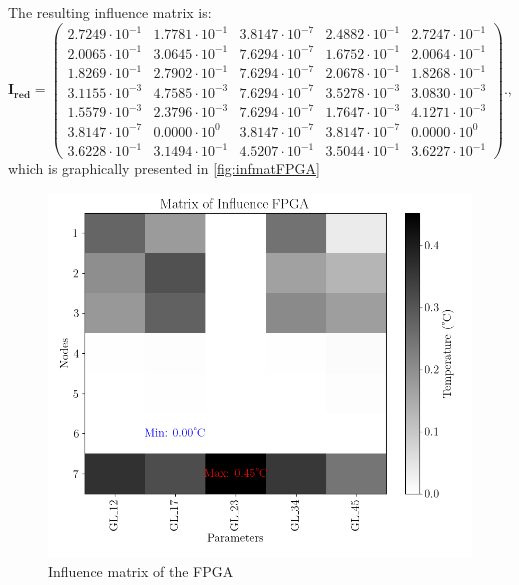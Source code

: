 The resulting influence matrix is:
\begin{equation}
    \boldsymbol{I_{red}} = \begin{pmatrix}
        2.7249 \cdot 10^{-1} & 1.7781 \cdot 10^{-1} & 3.8147 \cdot 10^{-7} & 2.4882 \cdot 10^{-1} & 2.7247 \cdot 10^{-1} \\
        2.0065 \cdot 10^{-1} & 3.0645 \cdot 10^{-1} & 7.6294 \cdot 10^{-7} & 1.6752 \cdot 10^{-1} & 2.0064 \cdot 10^{-1} \\
        1.8269 \cdot 10^{-1} & 2.7902 \cdot 10^{-1} & 7.6294 \cdot 10^{-7} & 2.0678 \cdot 10^{-1} & 1.8268 \cdot 10^{-1} \\
        3.1155 \cdot 10^{-3} & 4.7585 \cdot 10^{-3} & 7.6294 \cdot 10^{-7} & 3.5278 \cdot 10^{-3} & 3.0830 \cdot 10^{-3} \\
        1.5579 \cdot 10^{-3} & 2.3796 \cdot 10^{-3} & 7.6294 \cdot 10^{-7} & 1.7647 \cdot 10^{-3} & 4.1271 \cdot 10^{-3} \\
        3.8147 \cdot 10^{-7} & 0.0000 \cdot 10^{0} & 3.8147 \cdot 10^{-7} & 3.8147 \cdot 10^{-7} & 0.0000 \cdot 10^{0} \\
        3.6228 \cdot 10^{-1} & 3.1494 \cdot 10^{-1} & 4.5207 \cdot 10^{-1} & 3.5044 \cdot 10^{-1} & 3.6227 \cdot 10^{-1} 
      \end{pmatrix}.,
    \label{eq:infmatFPGA}
\end{equation}
 which is graphically presented in \autoref{fig:infmatFPGA}
 
 \begin{figure}[H]
     \centering
     \includegraphics[scale=0.5]{Figures/FPGA/FPGA-redinfmat.png}
     \caption{Influence matrix of the FPGA}
     \label{fig:infmatFPGA}
 \end{figure}

